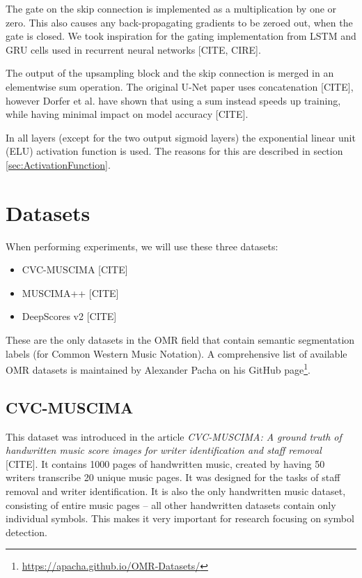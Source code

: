 The gate on the skip connection is implemented as a multiplication by one or zero. This also causes any back-propagating gradients to be zeroed out, when the gate is closed. We took inspiration for the gating implementation from LSTM and GRU cells used in recurrent neural networks [CITE, CIRE].

The output of the upsampling block and the skip connection is merged in an elementwise sum operation. The original U-Net paper uses concatenation [CITE], however Dorfer et al. have shown that using a sum instead speeds up training, while having minimal impact on model accuracy [CITE].

In all layers (except for the two output sigmoid layers) the exponential linear unit (ELU) activation function is used. The reasons for this are described in section \ref{sec:ActivationFunction}.


\section{Datasets}
\label{sec:Datasets}

When performing experiments, we will use these three datasets:

\begin{itemize}
    \item CVC-MUSCIMA [CITE]
    \item MUSCIMA++ [CITE]
    \item DeepScores v2 [CITE]
\end{itemize}

These are the only datasets in the OMR field that contain semantic segmentation labels (for Common Western Music Notation). A comprehensive list of available OMR datasets is maintained by Alexander Pacha on his GitHub page\footnote{\url{https://apacha.github.io/OMR-Datasets/}}.


\subsection{CVC-MUSCIMA}

This dataset was introduced in the article \emph{CVC-MUSCIMA: A ground truth of handwritten music score images for writer identification and staff removal} [CITE]. It contains 1000 pages of handwritten music, created by having 50 writers transcribe 20 unique music pages. It was designed for the tasks of staff removal and writer identification. It is also the only handwritten music dataset, consisting of entire music pages -- all other handwritten datasets contain only individual symbols. This makes it very important for research focusing on symbol detection.

